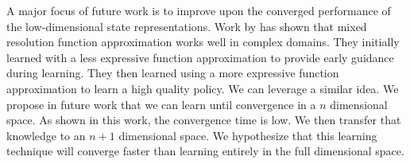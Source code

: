 \documentclass[twoside,11pt]{article}
\begin{document}
A major focus of future work is to improve upon the converged performance of the low-dimensional state representations. Work by \citet{Grzes::mixed} has shown that mixed resolution function approximation works well in complex domains.  They initially learned with a less expressive function approximation to provide early guidance during learning. They then learned using a more expressive function approximation to learn a high quality policy. We can leverage a similar idea. We propose in future work that we can learn until convergence in a $n$ dimensional space. As shown in this work, the convergence time is low.  We then transfer that knowledge to an $n+1$ dimensional space. We hypothesize that this learning technique will converge faster than learning entirely in the full dimensional space.
 



\end{document}
